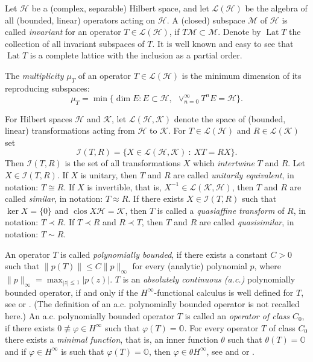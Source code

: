 \documentclass[a4paper,oneside,11pt]{amsart}
\numberwithin{equation}{section}
\theoremstyle{plain}
\theoremstyle{definition}
\begin{document}
 Let $\mathcal H$ be a (complex, separable) Hilbert space, 
and let  $\mathcal L(\mathcal H)$ be the algebra of all (bounded, linear)  operators acting on  $\mathcal H$. 
A (closed) subspace  $\mathcal M$ of  $\mathcal H$ is called \emph{invariant} 
for an operator $T\in\mathcal L(\mathcal H)$, if $T\mathcal M\subset\mathcal M$. 
 Denote by  $\operatorname{Lat}T$ the collection of all invariant subspaces of $T$. 
It is well known and easy to see that $\operatorname{Lat}T$ is a complete lattice 
with the inclusion as a partial order.  

The \emph{multiplicity} $\mu_T$ of an operator  $T\in \mathcal L(\mathcal H)$ 
 is the minimum dimension of its reproducing subspaces: 
\begin{equation}\label{mu}  \mu_T=\min\{\dim E: E\subset \mathcal H, \ \ 
\vee_{n=0}^\infty T^n E=\mathcal H \}.\end{equation}

For Hilbert spaces  $\mathcal H$ and $\mathcal K$, let    $\mathcal L(\mathcal H, \mathcal K)$ denote the space of (bounded, linear) 
transformations acting from $\mathcal H$ to $\mathcal K$.
For $T\in\mathcal L(\mathcal H)$ and  $R\in\mathcal L(\mathcal K)$ 
set
\begin{equation*}
\mathcal I(T,R)=\{X\in\mathcal L(\mathcal H, \mathcal K)\ :\ XT=RX\}.
\end{equation*} 
Then $\mathcal I(T,R)$ is the set of all transformations $X$ which  \emph{intertwine} $T$ and $R$.
Let $X\in\mathcal I(T,R)$.  
If $X$ is unitary, then $T$ and $R$ 
are called  \emph{unitarily equivalent}, in notation: $T\cong R$. If $X$ is invertible, that is, 
$X^{-1}\in\mathcal L(\mathcal K, \mathcal H)$, 
then $T$ and $R$ are called \emph{similar}, in notation: $T\approx R$. 
If there exists  $X\in\mathcal I(T,R)$  such that  $\ker X=\{0\}$ and $\operatorname{clos}X\mathcal H=\mathcal K$, then
$T$ is called a  \emph{quasiaffine transform} of $R$, in notation: $T\prec R$. 
If $T\prec R$ and $R\prec T$, then $T$ and $R$ are called  \emph{quasisimilar}, in notation: $T\sim R$. 



An  operator $T$ is called  \emph{polynomially bounded}, if 
there exists a constant $C>0$ such that $\|p(T)\|\leq C\|p\|_\infty$ for every (analytic) polynomial $p$,
 where $\|p\|_\infty=\max_{|z|\leq 1}|p(z)|$. 
 $T$ is an \emph{absolutely continuous (a.c.)}  polynomially bounded operator, 
if and only if the $H^\infty$-functional calculus is well defined for $T$, see \cite{mlak} or \cite{ker16}. 
(The definition of  an a.c.  polynomially bounded operator is not recalled here.) 
An a.c.  polynomially bounded operator $T$ is called an \emph{operator of class $C_0$}, 
if there exists $0\not\equiv\varphi\in H^\infty$ such that $\varphi(T)=\mathbb O$. 
For every operator $T$ of class $C_0$ there exists a \emph{minimal function}, that is, an inner function $\theta$
 such that $\theta(T)=\mathbb O$ and if $\varphi\in H^\infty$ is such that $\varphi(T)=\mathbb O$,
 then $\varphi\in\theta H^\infty$, see \cite{bercpr} and {\cite[Proposition III.4.4]{sznfbk}} or {\cite[Sec. II.1]{berc}}. 
 
\end{document}
